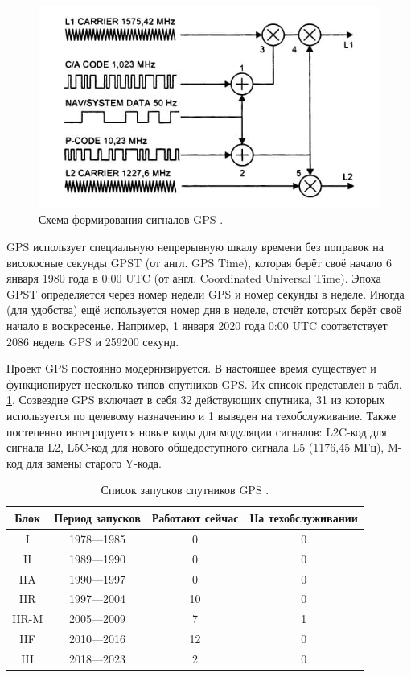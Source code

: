 \begin{figure}[h]
\centering    
\includegraphics[width=0.7\linewidth]{fig/fig-1.jpg}    
\caption{Схема формирования сигналов GPS \cite{4}.}
\label{fig-1}      
\end{figure}
 
GPS использует специальную непрерывную шкалу времени без поправок на високосные секунды GPST (от англ. GPS Time), которая берёт своё начало 6 января 1980 года в 0:00 UTC (от англ. Coordinated Universal Time).
Эпоха GPST определяется через номер недели GPS и номер секунды в неделе. 
Иногда (для удобства) ещё используется номер дня в неделе, отсчёт которых берёт своё начало в воскресенье.
Например, 1 января 2020 года 0:00 UTC соответствует 2086 недель GPS и 259200 секунд.

Проект GPS постоянно модернизируется.
В настоящее время существует и функционирует несколько типов спутников GPS.
Их список представлен в табл. \hyperref[tab-1]{1}.
Созвездие GPS включает в себя 32 действующих спутника, 31 из которых используется по целевому назначению и 1 выведен на техобслуживание. 
Также постепенно интегрируется новые коды для модуляции сигналов: L2C-код для сигнала L2, L5C-код для нового общедоступного сигнала L5 (1176,45 МГц), M-код для замены старого Y-кода.

\begin{table}[h]
\centering
\begin{tabular}{|c|c|c|c|}
\hline
Блок  & Период запусков     & Работают сейчас & На техобслуживании \\ \hline
I     & 1978—1985           & 0               & 0                  \\ \hline
II    & 1989—1990           & 0               & 0                  \\ \hline
IIA   & 1990—1997           & 0               & 0                  \\ \hline
IIR   & 1997—2004           & 10              & 0                  \\ \hline
IIR-M & 2005—2009           & 7               & 1                  \\ \hline
IIF   & 2010—2016           & 12              & 0                  \\ \hline
III   & 2018—2023           & 2               & 0                  \\ \hline
\end{tabular}
\caption{Список запусков спутников GPS \cite{5}.}
\label{tab-1}
\end{table}